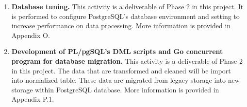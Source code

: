 \begin{enumerate}[topsep=0pt,itemsep=-1ex,partopsep=1ex,parsep=1.5ex]
	\item \textbf{Database tuning.}
	This activity is a deliverable of Phase 2 in this project. It is performed to configure PostgreSQL's database environment and setting to increase performance on data processing. More information is provided in Appendix O.
	
	\item \textbf{Development of PL/pgSQL's DML scripts and Go concurrent program for database migration.}
	This activity is a deliverable of Phase 2 in this project. The data that are transformed and cleaned will be import into normalized table. These data are migrated from legacy storage into new storage within PostgreSQL database. More information is provided in Appendix P.1.
	
\end{enumerate}

